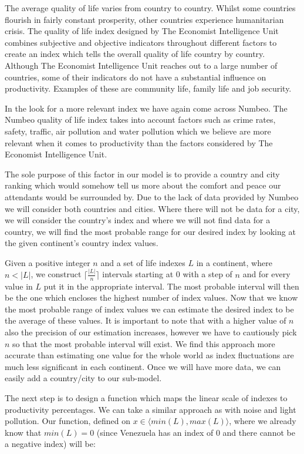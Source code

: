The average quality of life varies from country to country. Whilst some countries flourish in fairly constant prosperity, other countries experience humanitarian crisis. The quality of life index designed by The Economist Intelligence Unit combines subjective and objective indicators throughout different factors to create an index which tells the overall quality of life country by country. Although The Economist Intelligence Unit reaches out to a large number of countries, some of their indicators do not have a substantial influence on productivity. Examples of these are community life, family life and job security. 

In the look for a more relevant index we have again come across Numbeo. The Numbeo quality of life index takes into account factors such as crime rates, safety, traffic, air pollution and water pollution which we believe are more relevant when it comes to productivity than the factors considered by The Economist Intelligence Unit. 

The sole purpose of this factor in our model is to provide a country and city ranking which would somehow tell us more about the comfort and peace our attendants would be surrounded by. Due to the lack of data provided by Numbeo we will consider both countries and cities. Where there will not be data for a city, we will consider the country's index and where we will not find data for a country, we will find the most probable range for our desired index by looking at the given continent's country index values.

Given a positive integer $n$ and a set of life indexes $L$ in a continent, where $n < |L|$, we construct $ \lceil \frac{|L|}{n}\rceil$ intervals starting at 0 with a step of $n$ and for every value in $L$ put it in the appropriate interval. The most probable interval will then be the one which encloses the highest number of index values. Now that we know the most probable range of index values we can estimate the desired index to be the average of these values. It is important to note that with a higher value of $n$ also the precision of our estimation increases, however we have to cautiously pick $n$ so that the most probable interval will exist. We find this approach more accurate than estimating one value for the whole world as index fluctuations are much less significant in each continent. Once we will have more data, we can easily add a country/city to our sub-model.

The next step is to design a function which maps the linear scale of indexes to productivity percentages. We can take a similar approach as with noise and light pollution. Our function, defined on  $ x\in \langle min(L),max(L)\rangle$, where we already know that $min(L) = 0$ (since Venezuela has an index of 0 and there cannot be a negative index) will be: 

